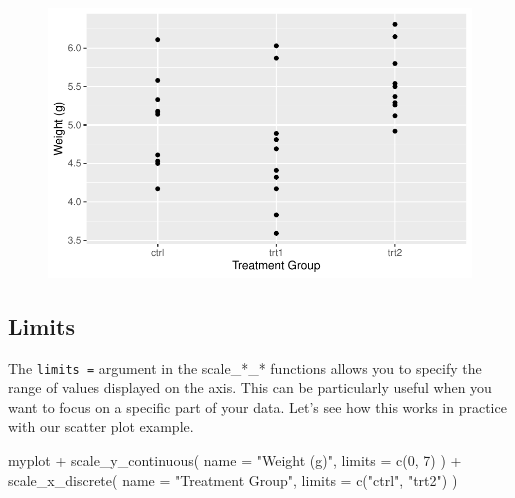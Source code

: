 \documentclass[
  letterpaper,
  DIV=11,
  numbers=noendperiod]{scrartcl}
\newenvironment{Shaded}{\begin{snugshade}}{\end{snugshade}}
\newcommand{\AttributeTok}[1]{\textcolor[rgb]{0.40,0.45,0.13}{#1}}
\newcommand{\DecValTok}[1]{\textcolor[rgb]{0.68,0.00,0.00}{#1}}
\newcommand{\FunctionTok}[1]{\textcolor[rgb]{0.28,0.35,0.67}{#1}}
\newcommand{\NormalTok}[1]{\textcolor[rgb]{0.00,0.23,0.31}{#1}}
\newcommand{\SpecialCharTok}[1]{\textcolor[rgb]{0.37,0.37,0.37}{#1}}
\newcommand{\StringTok}[1]{\textcolor[rgb]{0.13,0.47,0.30}{#1}}
\begin{document}
\begin{figure}[H]

{\centering \includegraphics{ggplot2intro_files/figure-pdf/unnamed-chunk-7-1.pdf}

}

\end{figure}

\hypertarget{limits}{%
\subsection{Limits}\label{limits}}

The \texttt{limits\ =} argument in the scale\_*\_* functions allows you
to specify the range of values displayed on the axis. This can be
particularly useful when you want to focus on a specific part of your
data. Let's see how this works in practice with our scatter plot
example.

\begin{Shaded}
\begin{Highlighting}[]
\NormalTok{myplot }\SpecialCharTok{+}
  \FunctionTok{scale\_y\_continuous}\NormalTok{(}
    \AttributeTok{name =} \StringTok{"Weight (g)"}\NormalTok{,}
    \AttributeTok{limits =} \FunctionTok{c}\NormalTok{(}\DecValTok{0}\NormalTok{, }\DecValTok{7}\NormalTok{)}
\NormalTok{  ) }\SpecialCharTok{+}
  \FunctionTok{scale\_x\_discrete}\NormalTok{(}
    \AttributeTok{name =} \StringTok{"Treatment Group"}\NormalTok{,}
    \AttributeTok{limits =} \FunctionTok{c}\NormalTok{(}\StringTok{"ctrl"}\NormalTok{, }\StringTok{"trt2"}\NormalTok{)}
\NormalTok{  )}
\end{Highlighting}
\end{Shaded}
\end{document}
